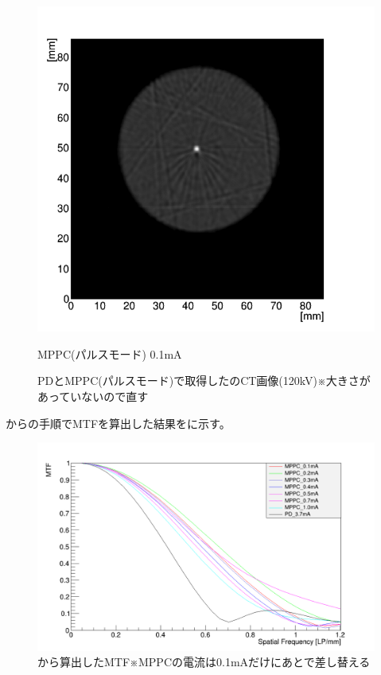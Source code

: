 \begin{figure}[H]
\begin{minipage}{0.5\hsize}
\begin{center}
 \includegraphics[bb=0.000000 0.000000 346.531353 333.572425,width=1\hsize]{image2/chapter5/CT_MTF_MPPCpulse.png} 
  \end{center}
  \vspace{-1cm}
  \caption*{MPPC(パルスモード) 0.1mA}
 \end{minipage}
 \begin{center}
  \caption{PDとMPPC(パルスモード)で取得したのCT画像(120kV)※大きさがあっていないので直す}
  \label{fig:CT_MTF}
  \end{center}
\end{figure}

からの手順でMTFを算出した結果をに示す。


\begin{figure}[H]
 \begin{center}
 \includegraphics[bb=0.000000 0.000000 1277.000000 789.000000,width=1\hsize]{image2/chapter5/MTF_matome.png} 
 \end{center}
 \caption{から算出したMTF※MPPCの電流は0.1mAだけにあとで差し替える}
 \label{fig:MTF_matome}
\end{figure}

